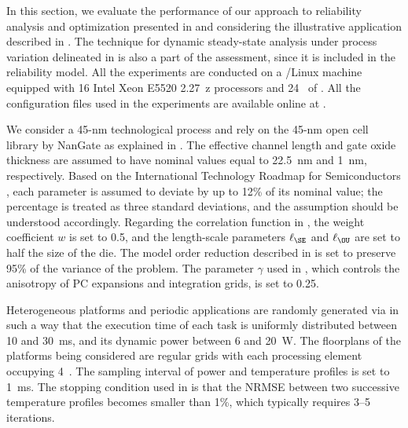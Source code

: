 In this section, we evaluate the performance of our approach to reliability
analysis and optimization presented in  and
 considering the illustrative application described in
. The technique for dynamic steady-state
analysis under process variation delineated in
 is also a part of the assessment, since it
is included in the reliability model. All the experiments are conducted on a
/Linux machine equipped with 16 Intel Xeon E5520 2.27~z
processors and 24~ of . All the configuration files used in the
experiments are available online at \cite{eslab2015}.

We consider a 45-nm technological process and rely on the 45-nm open cell
library by NanGate \cite{nangate} as explained in
. The effective channel length and gate
oxide thickness are assumed to have nominal values equal to 22.5~nm and 1~nm,
respectively. Based on the International Technology Roadmap for Semiconductors
\cite{itrs}, each parameter is assumed to deviate by up to 12\% of its nominal
value; the percentage is treated as three standard deviations, and the
assumption should be understood accordingly. Regarding the correlation function
in , the weight coefficient $w$ is set to 0.5, and the
length-scale parameters $\ell_\SE$ and $\ell_\OU$ are set to half the size of
the die. The model order reduction described in
 is set to preserve 95\% of the variance of the
problem. The parameter $\gamma$ used in , which
controls the anisotropy of \ac{PC} expansions and integration grids, is set to
0.25.

Heterogeneous platforms and periodic applications are randomly generated via
 \cite{dick1998} in such a way that the execution time of each task is
uniformly distributed between 10 and 30~ms, and its dynamic power between 6 and
20~W. The floorplans of the platforms being considered are regular grids with
each processing element occupying 4~. The sampling interval \dt of
power and temperature profiles is set to 1~ms. The stopping condition used in
 is that the \ac{NRMSE} between
two successive temperature profiles becomes smaller than 1\%, which typically
requires 3--5 iterations.



